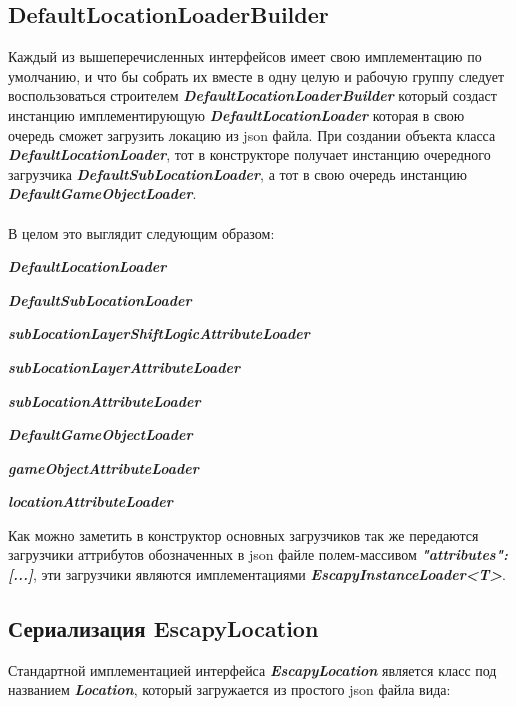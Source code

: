 \documentclass[11pt]{report}
\newenvironment{itemize*}%
  {\begin{itemize}%
    \setlength{\itemsep}{2pt}%
    \setlength{\parskip}{0.75pt}}%
  {\end{itemize}}
\begin{document}
\subsection{DefaultLocationLoaderBuilder}
Каждый из вышеперечисленных интерфейсов имеет свою имплементацию по умолчанию, и что бы собрать их вместе в одну целую и рабочую группу следует воспользоваться строителем 
\textit{\textbf{DefaultLocationLoaderBuilder}} который создаст инстанцию имплементирующую 
\textit{\textbf{DefaultLocationLoader}} которая в свою очередь сможет загрузить локацию из json файла. При создании объекта класса \textit{\textbf{DefaultLocationLoader}}, тот в конструкторе получает инстанцию очередного загрузчика \textit{\textbf{DefaultSubLocationLoader}}, а тот в свою очередь 
инстанцию \textit{\textbf{DefaultGameObjectLoader}}. \\\\
В целом это выглядит следующим образом: 
\begin{itemize*}
	\item \textit{\textbf{DefaultLocationLoader}}
	\begin{itemize*}
		
		\item \textit{\textbf{DefaultSubLocationLoader}}
		\begin{itemize*}
			\item \textit{\textbf{subLocationLayerShiftLogicAttributeLoader}}
			\item \textit{\textbf{subLocationLayerAttributeLoader}}
			\item \textit{\textbf{subLocationAttributeLoader}}
			\item \textit{\textbf{DefaultGameObjectLoader}}
			\begin{itemize*}
				\item \textit{\textbf{gameObjectAttributeLoader}}
			\end{itemize*}
		\end{itemize*}
		\item \textit{\textbf{locationAttributeLoader}}
		\\
	\end{itemize*}
\end{itemize*}
Как можно заметить в конструктор основных загрузчиков так же передаются загрузчики аттрибутов обозначенных в json файле полем-массивом \textit{\textbf{"attributes": [...]}}, эти загрузчики являются имплементациями \textit{\textbf{EscapyInstanceLoader<T>}}.

\newpage
\subsection{Сериализация EscapyLocation}
Стандартной имплементацией интерфейса \textit{\textbf{EscapyLocation}} является класс под названием \textit{\textbf{Location}}, который загружается из простого json файла вида:
\end{document}
